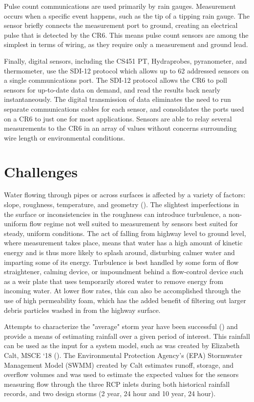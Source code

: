 Pulse count communications are used primarily by rain gauges.
Measurement occurs when a specific event happens, such as the tip of a tipping rain gauge.
The sensor briefly connects the measurement port to ground, creating an electrical pulse that is detected by the CR6.
This means pulse count sensors are among the simplest in terms of wiring, as they require only a measurement and ground lead.

Finally, digital sensors, including the CS451 PT, Hydraprobes, pyranometer, and thermometer, use the SDI-12 protocol which allows up to 62 addressed sensors on a single communications port.
The SDI-12 protocol allows the CR6 to poll sensors for up-to-date data on demand, and read the results back nearly instantaneously.
The digital transmission of data eliminates the need to run separate communications cables for each sensor, and consolidates the ports used on a CR6 to just one for most applications.
Sensors are able to relay several measurements to the CR6 in an array of values without concerns surrounding wire length or environmental conditions.

\section{Challenges}
\label{sec:challenges}

Water flowing through pipes or across surfaces is affected by a variety of factors: slope, roughness, temperature, and geometry (\cite{mays2010water}).
The slightest imperfections in the surface or inconsistencies in the roughness can introduce turbulence, a non-uniform flow regime not well suited to measurement by sensors best suited for steady, uniform conditions.
The act of falling from highway level to ground level, where measurement takes place, means that water has a high amount of kinetic energy and is thus more likely to splash around, disturbing calmer water and imparting some of its energy.
Turbulence is best handled by some form of flow straightener, calming device, or impoundment behind a flow-control device such as a weir plate that uses temporarily stored water to remove energy from incoming water.
At lower flow rates, this can also be accomplished through the use of high permeability foam, which has the added benefit of filtering out larger debris particles washed in from the highway surface.

Attempts to characterize the "average" storm year have been successful (\cite{Albright2018}) and provide a means of estimating rainfall over a given period of interest.
This rainfall can be used as the input for a system model, such as was created by Elizabeth Calt, MSCE `18 (\cite{Calt2018}).
The Environmental Protection Agency's (EPA) Stormwater Management Model (SWMM) created by Calt estimates runoff, storage, and overflow volumes and was used to estimate the expected values for the sensors measuring flow through the three RCP inlets during both historical rainfall records, and two design storms (2 year, 24 hour and 10 year, 24 hour).

